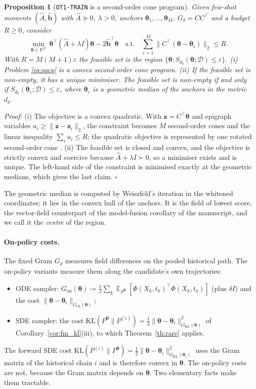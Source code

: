 \documentclass{article}
\DeclareMathOperator{\E}{\mathbb{E}}
\newcommand{\RR}{\mathbb{R}}
\newcommand{\cD}{\mathcal{D}}                       %
\newcommand{\Pv}[1]{P^{#1}}                         %
\newcommand{\KL}{\mathrm{KL}}
\newcommand{\Gon}{G_{\mathrm{on}}}
\newcommand{\GKL}{G_{\mathrm{KL}}}
\newcommand{\bth}{\boldsymbol{\theta}}
\newcommand{\bz}{\mathbf{z}}
\theoremstyle{plain}
\newtheorem{proposition}{Proposition}
\begin{document}
\begin{proposition}[\texttt{OT1-TRAIN} is a second-order cone program]\label{pr:socp}
Given few-shot moments $(\hat A,\hat{\mathbf{b}})$ with $\hat A\succeq0$, $\lambda>0$, anchors
$\bth_1,\dots,\bth_M$, $G_\delta=CC^\top$ and a budget $R\geq0$, consider
\begin{equation}\label{eq:socp}
  \min_{\bth\in\RR^D}\ \bth^\top(\hat A+\lambda I)\bth-2\hat{\mathbf{b}}^\top\bth
  \quad\text{s.t.}\quad\sum_{i=1}^M\|C^\top(\bth-\bth_i)\|_2\leq R .
\end{equation}
With $R=M(M+1)\varepsilon$ the feasible set is the region $\{\bth:S_{d_\delta}(\bth;\cD)\leq\varepsilon\}$.
(i) Problem \eqref{eq:socp} is a convex second-order cone program. (ii) If the feasible set is
non-empty, it has a unique minimiser. The feasible set is non-empty if and only if
$S_{d_\delta}(\bth_c;\cD)\leq\varepsilon$, where $\bth_c$ is a geometric median of the anchors in the metric
$d_\delta$.
\end{proposition}
\textit{Proof:}
(i) The objective is a convex quadratic. With $\bz=C^\top\bth$ and epigraph variables
$u_i\geq\|\bz-\bz_i\|_2$, the constraint becomes $M$ second-order cones and the linear inequality
$\sum_iu_i\leq R$; the quadratic objective is represented by one rotated second-order cone
\citep{boyd2004convex}.
(ii) The feasible set is closed and convex, and the objective is strictly convex and coercive
because $\hat A+\lambda I\succ0$, so a minimiser exists and is unique. The left-hand side of the
constraint is minimised exactly at the geometric medians, which gives the last claim.
\hfill $\square$

The geometric median is computed by Weiszfeld's iteration \citep{weiszfeld1937point} in the
whitened coordinates; it lies in the convex hull of the anchors. It is the field of lowest
score, the vector-field counterpart of the model-fusion corollary of the manuscript, and we
call it the \emph{centre} of the region.

\paragraph{On-policy costs.}
The fixed Gram $G_\rho$ measures field differences on the pooled historical path. The
on-policy variants measure them along the candidate's own trajectories:
\begin{itemize}
\item ODE sampler: $\Gon(\bth)\coloneqq\frac1J\sum_k\E_{\Pv{\bth}}[\Phi(X_k,t_k)^\top\Phi(X_k,t_k)]$
(plus $\delta I$) and the cost $\|\bth-\bth_i\|_{\Gon(\bth)}$;
\item SDE sampler: the cost $\KL(\Pv{\bth}\|P^{(i)})=\frac12\|\bth-\bth_i\|^2_{\GKL(\bth)}$ of
Corollary~\ref{cor:fm_kl}(iii), to which Theorem~\ref{th:rare} applies.
\end{itemize}
The forward SDE cost $\KL(P^{(i)}\|\Pv{\bth})=\frac12\|\bth-\bth_i\|^2_{\GKL(\bth_i)}$ uses the Gram matrix of
the historical chain $i$ and is therefore convex in $\bth$. The on-policy costs are not, because
the Gram matrix depends on $\bth$. Two elementary facts make them tractable.
\end{document}
